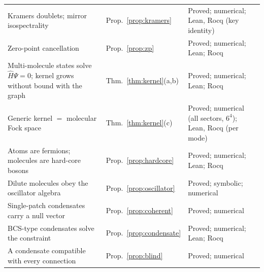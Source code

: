 \documentclass[reprint,aps,prd,amsmath,amssymb,superscriptaddress,nofootinbib,floatfix]{revtex4-2}
\theoremstyle{plain}
\theoremstyle{definition}
\theoremstyle{remark}
\newcommand{\Hc}{\hat{H}}
\begin{document}
\begin{table}[t]
\begin{ruledtabular}
\begin{tabular}{lll}
\parbox[t]{0.52\textwidth}{\raggedright Kramers doublets; mirror isospectrality\strut} & \parbox[t]{0.17\textwidth}{\raggedright Prop.~\ref{prop:kramers}\strut} & \parbox[t]{0.25\textwidth}{\raggedright Proved; numerical; Lean, Rocq (key identity)\strut} \\
\parbox[t]{0.52\textwidth}{\raggedright Zero-point cancellation\strut} & \parbox[t]{0.17\textwidth}{\raggedright Prop.~\ref{prop:zp}\strut} & \parbox[t]{0.25\textwidth}{\raggedright Proved; numerical; Lean; Rocq\strut} \\
\parbox[t]{0.52\textwidth}{\raggedright Multi-molecule states solve $\Hc\Psi=0$; kernel grows without bound with the graph\strut} & \parbox[t]{0.17\textwidth}{\raggedright Thm.~\ref{thm:kernel}(a,b)\strut} & \parbox[t]{0.25\textwidth}{\raggedright Proved; numerical; Lean; Rocq\strut} \\
\parbox[t]{0.52\textwidth}{\raggedright Generic kernel $=$ molecular Fock space\strut} & \parbox[t]{0.17\textwidth}{\raggedright Thm.~\ref{thm:kernel}(c)\strut} & \parbox[t]{0.25\textwidth}{\raggedright Proved; numerical (all sectors, $6^4$); Lean, Rocq (per mode)\strut} \\
\parbox[t]{0.52\textwidth}{\raggedright Atoms are fermions; molecules are hard-core bosons\strut} & \parbox[t]{0.17\textwidth}{\raggedright Prop.~\ref{prop:hardcore}\strut} & \parbox[t]{0.25\textwidth}{\raggedright Proved; numerical; Lean; Rocq\strut} \\
\parbox[t]{0.52\textwidth}{\raggedright Dilute molecules obey the oscillator algebra\strut} & \parbox[t]{0.17\textwidth}{\raggedright Prop.~\ref{prop:oscillator}\strut} & \parbox[t]{0.25\textwidth}{\raggedright Proved; symbolic; numerical\strut} \\
\parbox[t]{0.52\textwidth}{\raggedright Single-patch condensates carry a null vector\strut} & \parbox[t]{0.17\textwidth}{\raggedright Prop.~\ref{prop:coherent}\strut} & \parbox[t]{0.25\textwidth}{\raggedright Proved; numerical\strut} \\
\parbox[t]{0.52\textwidth}{\raggedright BCS-type condensates solve the constraint\strut} & \parbox[t]{0.17\textwidth}{\raggedright Prop.~\ref{prop:condensate}\strut} & \parbox[t]{0.25\textwidth}{\raggedright Proved; numerical; Lean; Rocq\strut} \\
\parbox[t]{0.52\textwidth}{\raggedright A condensate compatible with every connection\strut} & \parbox[t]{0.17\textwidth}{\raggedright Prop.~\ref{prop:blind}\strut} & \parbox[t]{0.25\textwidth}{\raggedright Proved; numerical\strut} \\

\end{tabular}
\end{ruledtabular}
\end{table}
\end{document}
